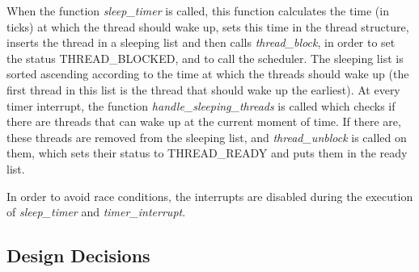 	When the function \textit{sleep\_timer} is called, this function calculates the time (in ticks) at which the thread should wake up, sets this time in the thread structure, inserts the thread in a sleeping list and then calls \textit{thread\_block}, in order to set the status THREAD\_BLOCKED, and to call the scheduler. The sleeping list is sorted ascending according to the time at which the threads should wake up (the first thread in this list is the thread that should wake up the earliest). At every timer interrupt, the function \textit{handle\_sleeping\_threads} is called which checks if there are threads that can wake up at the current moment of time. If there are, these threads are removed from the sleeping list, and \textit{thread\_unblock} is called on them, which sets their status to THREAD\_READY and puts them in the ready list.

	In order to avoid race conditions, the interrupts are disabled during the execution of \textit{sleep\_timer} and \textit{timer\_interrupt}.






    \subsection{Design Decisions}

